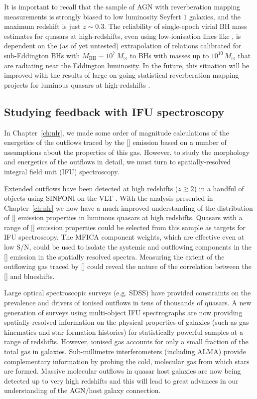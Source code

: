 It is important to recall that the sample of AGN with reverberation mapping measurements is strongly biased to low luminosity Seyfert $1$ galaxies, and the maximum redshift is just $z\sim0.3$.
The reliability of single-epoch virial BH mass estimates for quasars at high-redshifts, even using low-ionisation lines like \hbns, is dependent on the (as of yet untested) extrapolation of relations calibrated for sub-Eddington BHs with $M_{\text{BH}}\sim10^7\,M_\odot$ to BHs with masses up to $10^{10}\,M_\odot$ that are radiating near the Eddington luminosity. 
In the future, this situation will be improved with the results of large on-going statistical reverberation mapping projects for luminous quasars at high-redshifts \citep[e.g.][]{shen15,kingoz15}. 

\subsection{Studying feedback with IFU spectroscopy}

In Chapter~\ref{ch:nlr}, we made some order of magnitude calculations of the energetics of the outflows traced by the [] emission based on a number of assumptions about the properties of this gas. 
However, to study the morphology and energetics of the outflows in detail, we must turn to spatially-resolved integral field unit (IFU) spectroscopy.

Extended outflows have been detected at high redshifts ($z\gtrsim2$) in a handful of objects using SINFONI on the VLT \citep[e.g.][]{carniani15}. 
With the analysis presented in Chapter~\ref{ch:nlr} we now have a much improved understanding of the distribution of [] emission properties in luminous quasars at high redshifts. 
Quasars with a range of [] emission properties could be selected from this sample as targets for IFU spectroscopy. 
The MFICA component weights, which are effective even at low S/N, could be used to isolate the systemic and outflowing components in the [] emission in the spatially resolved spectra.
Measuring the extent of the outflowing gas traced by [] could reveal the nature of the correlation between the [] and  blueshifts.

Large optical spectroscopic surveys (e.g. SDSS) have provided constraints on the prevalence and drivers of ionised outflows in tens of thousands of quasars.
A new generation of surveys using multi-object IFU spectrographs \citep[including KMOS, MaNGA and SAMI;][]{croom12,sharples13,bundy15} are now providing spatially-resolved information on the physical properties of galaxies (such as gas kinematics and star formation histories) for statistically powerful samples at a range of redshifts. 
However, ionised gas accounts for only a small fraction of the total gas in galaxies.
Sub-millimetre interferometers (including ALMA) provide complementary information by probing the cold, molecular gas from which stars are formed. 
Massive molecular outflows in quasar host galaxies are now being detected up to very high redshifts \citep[e.g.][]{maiolino12} and this will lead to great advances in our understanding of the AGN/host galaxy connection. 


 

 







